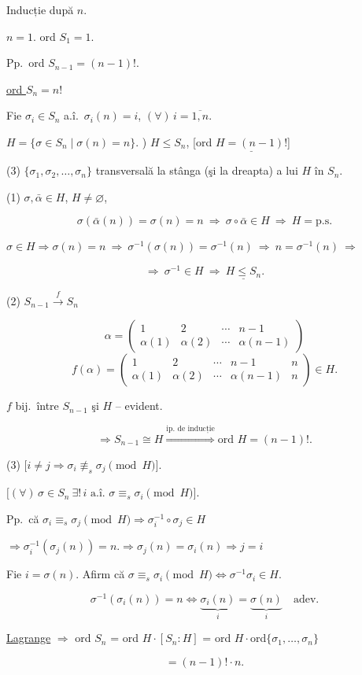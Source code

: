 \documentclass[12pt]{article}
\begin{document}
\noindent Inducție după $n$.

\bigskip
\noindent $n=1$. \quad ord $S_1=1$.

\bigskip
\noindent Pp.\ ord $S_{n-1}=(n-1)!$.

\noindent\underline{ord $S_n=n!$}

\bigskip
\noindent Fie $\sigma_i\in S_n$ a.î.\ $\sigma_i(n)=i$, $(\forall)\, i=\overline{1,n}$.

\bigskip
\noindent $H=\{\sigma\in S_n \mid \sigma(n)=n\}$. ) \underline{$H\leq S_n$}, [ord $\underline{H=(n-1)!}$]

\bigskip
\noindent (3) $\{\sigma_1,\sigma_2,\ldots,\sigma_n\}$ transversală la stânga (şi la dreapta) a lui $H$ în $S_n$.

\bigskip
\noindent (1) $\sigma,\bar\alpha\in H$, $H\neq\varnothing$,

\[
\sigma(\bar\alpha(n))=\sigma(n)=n \ \Rightarrow \ \sigma\circ\bar\alpha\in H \ \Rightarrow \ H = \text{p.s.}
\]

\noindent $\sigma\in H \Rightarrow \sigma(n)=n \ \Rightarrow \ \sigma^{-1}(\sigma(n))=\sigma^{-1}(n) \ \Rightarrow \ n=\sigma^{-1}(n) \ \Rightarrow$

\[
\Rightarrow \ \sigma^{-1}\in H \ \Rightarrow \ \underline{H\leq S_n}.
\]

\bigskip
\noindent (2) \quad $S_{n-1} \xrightarrow{\ f\ } S_n$

\[
\alpha = \begin{pmatrix} 1 & 2 & \cdots & n-1 \\ \alpha(1) & \alpha(2) & \cdots & \alpha(n-1) \end{pmatrix}
\]
\[
f(\alpha) = \begin{pmatrix} 1 & 2 & \cdots & n-1 & n \\ \alpha(1) & \alpha(2) & \cdots & \alpha(n-1) & n \end{pmatrix} \in H.
\]

\noindent $f$ bij.\ între $S_{n-1}$ şi $H$ -- evident.

\[
\Rightarrow S_{n-1}\cong H \overset{\text{ip.\ de inducție}}{\Longrightarrow} \text{ord } H=(n-1)!.
\]

\bigskip
\noindent (3) \quad $\big[i\neq j \Rightarrow \sigma_i \not\equiv_s \sigma_j \pmod H\big]$.

\noindent $\big[(\forall)\, \sigma\in S_n \ \exists!\, i \text{ a.î. } \sigma\equiv_s \sigma_i \pmod H\big]$.

\bigskip
\noindent Pp.\ că $\sigma_i\equiv_s\sigma_j \pmod H \Rightarrow \sigma_i^{-1}\circ\sigma_j\in H$

\noindent $\Rightarrow \sigma_i^{-1}(\sigma_j(n))=n. \Rightarrow \sigma_j(n)=\sigma_i(n) \Rightarrow j=i$

\bigskip
\noindent Fie $i=\sigma(n)$. Afirm că $\sigma\equiv_s\sigma_i \pmod H \Leftrightarrow \sigma^{-1}\sigma_i\in H$.

\[
\sigma^{-1}(\sigma_i(n))=n \Leftrightarrow \underbrace{\sigma_i(n)}_{i} = \underbrace{\sigma(n)}_{i} \quad \text{adev.}
\]

\bigskip
\noindent\underline{Lagrange} $\Rightarrow$ ord $S_n$ = ord $H\cdot[S_n:H]$ = ord $H\cdot$ord$\{\sigma_1,\ldots,\sigma_n\}$

\[
= (n-1)!\cdot n.
\]
\end{document}
